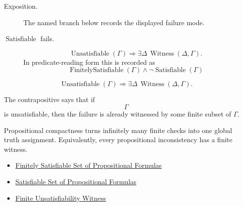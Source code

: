 \begin{remark*}
\begin{description}
  \item[Exposition.] The named branch below records the displayed failure mode.
\item[\(\operatorname{Satisfiable}\) fails.] \[
\operatorname{Unsatisfiable}(\Gamma)
\Rightarrow
\exists\Delta\,\operatorname{Witness}(\Delta,\Gamma).
\]
  In predicate-reading form this is recorded as
  \[
  \operatorname{FinitelySatisfiable}(\Gamma)\land
  \neg\operatorname{Satisfiable}(\Gamma)
  \]
\end{description}
\end{remark*}

\begin{remark*}
\[
\operatorname{Unsatisfiable}(\Gamma)
\Rightarrow
\exists\Delta\,\operatorname{Witness}(\Delta,\Gamma).
\]
\end{remark*}

\begin{remark*}
The contrapositive says that if \[
  \Gamma
\] is unsatisfiable, then the failure is
already witnessed by some finite subset of \(\Gamma\).
\end{remark*}

\begin{remark*}[Interpretation]
Propositional compactness turns infinitely many finite checks into one global
truth assignment. Equivalently, every propositional inconsistency has a finite
witness.
\end{remark*}

\begin{dependencies}
\begin{itemize}
  \item \hyperref[def:finitely-satisfiable-set-of-propositional-formulas]{Finitely Satisfiable Set of Propositional Formulas}
  \item \hyperref[def:satisfiable-set-of-propositional-formulas]{Satisfiable Set of Propositional Formulas}
  \item \hyperref[def:finite-unsatisfiability-witness-propositional-logic]{Finite Unsatisfiability Witness}
\end{itemize}
\end{dependencies}
